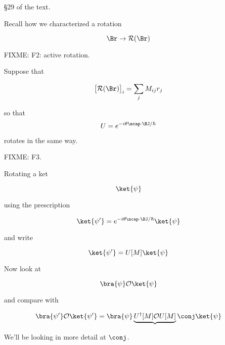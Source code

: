 \S 29 of the text.

Recall how we characterized a rotation

\begin{equation}\label{eqn:qmTwoL18:n}
\Br \rightarrow \mathcal{R}(\Br)
\end{equation}

FIXME: F2: active rotation.

Suppose that 

\begin{equation}\label{eqn:qmTwoL18:n}
{\begin{bmatrix}
\mathcal{R}(\Br)
\end{bmatrix}
}_i
= 
\sum_j M_{ij} r_j
\end{equation}

so that
\begin{equation}\label{eqn:qmTwoL18:n}
U = e^{-i \theta \ncap \cdot \BJ/\hbar}
\end{equation}

rotates in the same way.

FIXME: F3.

Rotating a ket

\begin{equation}\label{eqn:qmTwoL18:n}
\ket{\psi}
\end{equation}

using the prescription

\begin{equation}\label{eqn:qmTwoL18:n}
\ket{\psi'} = e^{-i \theta \ncap \cdot \BJ/\hbar} \ket{\psi}
\end{equation}

and write

\begin{equation}\label{eqn:qmTwoL18:n}
\ket{\psi'} = U[M] \ket{\psi}
\end{equation}

Now look at 

\begin{equation}\label{eqn:qmTwoL18:n}
\bra{\psi} \mathcal{O} \ket{\psi}
\end{equation}

and compare with

\begin{equation}\label{eqn:qmTwoL18:n}
\bra{\psi'} \mathcal{O} \ket{\psi'}
=
\bra{\psi} \underbrace{U^\dagger[M] \mathcal{O} U[M]}{\conj} \ket{\psi}
\end{equation}

We'll be looking in more detail at $\conj$.

\EndArticle
